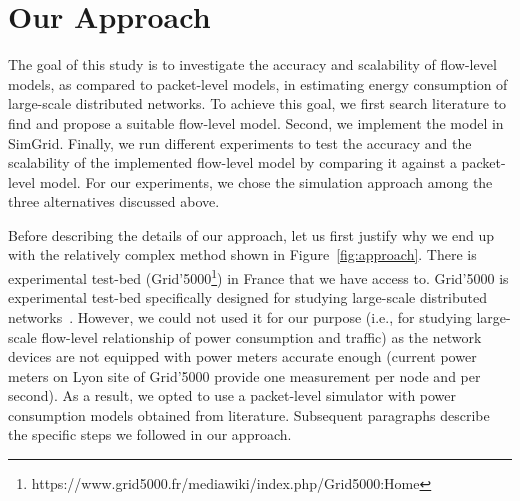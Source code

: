 \section{Our Approach}
\label{section:ourapproach}
The goal of this study is to investigate the accuracy and scalability of flow-level models, as compared to packet-level models, in estimating energy consumption of large-scale distributed networks. To achieve this goal, we first search literature to find and propose a suitable flow-level model. Second, we implement the model in SimGrid. Finally, we run different experiments to test the accuracy and the scalability of the implemented flow-level model by comparing it against a packet-level model. For our experiments, we chose the simulation approach among the three alternatives discussed above. 

Before describing the details of our approach, let us first justify why we end up with the relatively complex method shown in Figure~\ref{fig:approach}. There is experimental test-bed (Grid'5000\footnote{https://www.grid5000.fr/mediawiki/index.php/Grid5000:Home}) in France that we have access to. Grid'5000 is experimental test-bed specifically designed for studying large-scale distributed networks~\cite{DBLP:journals/ijhpca/BolzeCCDDJJLLMMNPQRTT06}. However, we could not used it for our purpose (i.e., for studying large-scale flow-level relationship of power consumption and traffic) as the network devices are not equipped with power meters accurate enough (current power meters on Lyon site of Grid'5000 provide one measurement per node and per second). As a result, we opted to use a packet-level simulator with power consumption models obtained from literature. Subsequent paragraphs describe the specific steps we followed in our approach.

